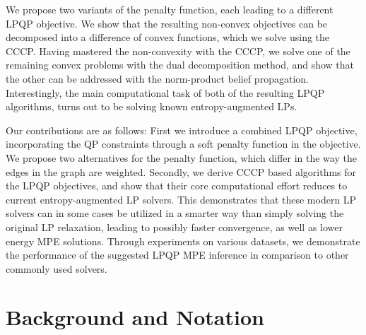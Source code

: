 We propose two variants of the penalty function, each leading to a
different \ac{LPQP} objective. We show that the resulting non-convex objectives can be 
decomposed into a difference of convex functions, which we solve using the
\acf{CCCP}. Having mastered the non-convexity with the
\ac{CCCP}, we solve one of the remaining convex problems with the dual decomposition method,
and show that the other can be addressed with the norm-product belief propagation.
Interestingly, the main computational task of both of 
the resulting \ac{LPQP} algorithms, turns out to be solving known entropy-augmented
\acp{LP}. 

Our contributions are as follows: First we introduce a combined
\ac{LPQP} objective, incorporating the \ac{QP} constraints through a soft penalty
function in the objective. We propose two alternatives for the penalty function, which
differ in the way the edges in the graph are weighted. Secondly, we derive
\ac{CCCP} based algorithms for the \ac{LPQP} objectives, and show that their core
computational effort reduces to current entropy-augmented \ac{LP} solvers. 
This demonstrates that these modern \ac{LP} solvers can in some cases be utilized in a 
smarter way than simply solving the original \ac{LP} relaxation,
leading to possibly faster convergence, as well as lower energy
\ac{MPE} solutions.
Through experiments on various datasets, we demonstrate the performance 
of the suggested \ac{LPQP} \ac{MPE} inference in comparison to other commonly used solvers. 

\section{Background and Notation}

